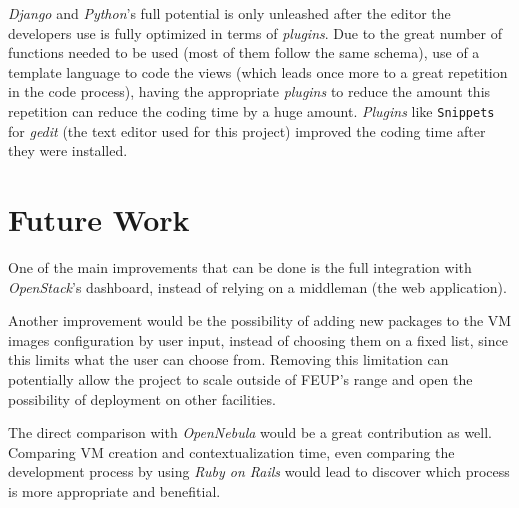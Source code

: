 \textit{Django} and \textit{Python}'s full potential is only unleashed after the editor the developers use is fully optimized in terms of \textit{plugins}. Due to the great number of functions needed to be used (most of them follow the same schema), use of a template language to code the views (which leads once more to a great repetition in the code process), having the appropriate \textit{plugins} to reduce the amount this repetition can reduce the coding time by a huge amount. \textit{Plugins} like \texttt{Snippets} for \textit{gedit} (the text editor used for this project) improved the coding time after they were installed.

\section{Future Work}\label{sec:future-work}

One of the main improvements that can be done is the full integration with \textit{OpenStack}'s dashboard, instead of relying on a middleman (the web application).

Another improvement would be the possibility of adding new packages to the VM images configuration by user input, instead of choosing them on a fixed list, since this limits what the user can choose from. Removing this limitation can potentially allow the project to scale outside of FEUP's range and open the possibility of deployment on other facilities. 

The direct comparison with \textit{OpenNebula} would be a great contribution as well. Comparing VM creation and contextualization time, even comparing the development process by using \textit{Ruby on Rails} would lead to discover which process is more appropriate and benefitial.
